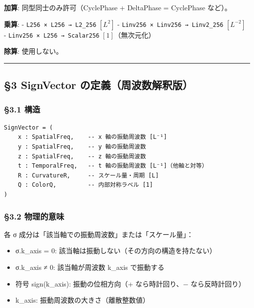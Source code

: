 \documentclass[a4paper,11pt]{ltjsarticle}
\providecommand{\tightlist}{\setlength{\itemsep}{0pt}\setlength{\parskip}{0pt}}
\begin{document}
\textbf{加算}: 同型同士のみ許可（CyclePhase + DeltaPhase = CyclePhase
など）。

\textbf{乗算}: - \texttt{L256\ ×\ L256\ →\ L2\_256} \([L^2]\) -
\texttt{Linv256\ ×\ Linv256\ →\ Linv2\_256} \([L^{-2}]\) -
\texttt{Linv256\ ×\ L256\ →\ Scalar256} \([1]\)（無次元化）

\textbf{除算}: 使用しない。

\begin{center}\rule{0.5\linewidth}{0.5pt}\end{center}

\subsection{§3 SignVector
の定義（周波数解釈版）}\label{signvector-ux306eux5b9aux7fa9ux5468ux6ce2ux6570ux89e3ux91c8ux7248}

\subsubsection{§3.1 構造}\label{ux69cbux9020}

\begin{verbatim}
SignVector = (
    x : SpatialFreq,    -- x 軸の振動周波数 [L⁻¹]
    y : SpatialFreq,    -- y 軸の振動周波数
    z : SpatialFreq,    -- z 軸の振動周波数
    t : TemporalFreq,   -- t 軸の振動周波数 [L⁻¹]（他軸と対等）
    R : CurvatureR,     -- スケール量・周期 [L]
    Q : ColorQ,         -- 内部対称ラベル [1]
)
\end{verbatim}

\subsubsection{§3.2 物理的意味}\label{ux7269ux7406ux7684ux610fux5473}

各 σ 成分は「該当軸での振動周波数」または「スケール量」：

\begin{itemize}
\tightlist
\item
  σ.k\_axis = 0: 該当軸は振動しない（その方向の構造を持たない）
\item
  σ.k\_axis ≠ 0: 該当軸が周波数 \textbar k\_axis\textbar{} で振動する
\item
  符号 sign(k\_axis): 振動の位相方向（+ なら時計回り、− なら反時計回り）
\item
  \textbar k\_axis\textbar: 振動周波数の大きさ（離散整数値）
\end{itemize}
\end{document}
